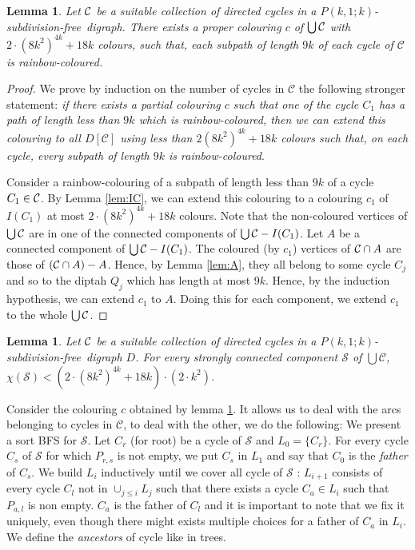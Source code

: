 \documentclass[utf8,10pt]{article}
\theoremstyle{plain}
\newtheorem{lemma}[theorem]{Lemma}
\theoremstyle{definition}
\theoremstyle{remark}
\newcommand{\dr}{ k^2}
\newcommand{\col}{(8k^2)^{4k}}
\newcommand{\free}{subdivision-free}
\begin{document}
\begin{lemma}\label{lem:col-union-cycle}
Let ${\cal C}$ be a suitable collection of directed cycles in a $P(k,1;k)$-\free\ digraph.
There exists a proper colouring $c$ of $\bigcup{\cal C}$ with $2\cdot \col + 18k$ colours, such that, each subpath of length $9k$ of each cycle of $\mathcal{C}$ is rainbow-coloured.
\end{lemma}
\begin{proof}
We prove by induction on the number of cycles in $\mathcal{C}$ the following stronger statement:
{\it if there exists
a partial colouring $c$ such that one of the cycle $C_1$ has a path of length less than $9k$
which is rainbow-coloured, then we can extend this colouring to all $D[\mathcal{C}]$ using less
than $2\col +18k$ colours such that, on each cycle, every subpath of length
$9k$ is rainbow-coloured}.

Consider a rainbow-colouring of a subpath of length less than $9k$ of a cycle $C_1\in {\cal C}$.
By Lemma \ref{lem:IC}, we can extend this colouring to a colouring $c_1$ of $I(C_1)$ at most $2\cdot \col + 18k$ colours.
Note that the non-coloured vertices of $\bigcup{\cal C}$ are in one of the connected components of $\bigcup{\cal C} - I(C_1)$.
Let $A$ be a connected component of $\bigcup{\cal C} - I(C_1)$. The coloured (by $c_1$) vertices of ${\cal C}\cap A$ are those of $({\cal C}\cap A)-A$. Hence, by Lemma \ref{lem:A}, they all belong to some cycle $C_j$ and so to the diptah $Q_j$ which has length at most $9k$.
Hence, by the induction hypothesis, we can extend $c_1$ to $A$. Doing this for each component, we extend $c_1$ to the whole $\bigcup{\cal C}$.
\end{proof}





\begin{lemma}\label{lem:DC}
Let ${\cal C}$ be a suitable collection of directed cycles in a $P(k,1;k)$-\free\ digraph $D$.
For every strongly connected component $\mathcal{S}$ of $\bigcup \mathcal{C}$, 
$\chi(\mathcal{S}) < (2\cdot \col + 18k) \cdot (2 \cdot \dr)$.
\end{lemma}

Consider the colouring $c$ obtained by lemma \ref{lem:col-union-cycle}. It allows us 
to deal with the arcs belonging to cycles in $\mathcal{C}$, to deal with the other, we do the following:
We present a sort BFS for $\mathcal{S}$.
Let $C_r$ (for root) be a cycle of $\mathcal{S}$ and $L_0 = \{C_r\}$. For every cycle $C_s$ of $\mathcal{S}$ for which 
$P_{r,s}$ is not empty, we put $C_s$ in $L_1$ and say that $C_0$ is the \textit{father} of $C_s$. We build $L_i$ inductively
until we cover all cycle of $\mathcal{S}$ : $L_{i+1}$ consists of every cycle $C_l$ not in $\cup_{j \leq i} L_j$ such that 
there exists a cycle $C_a \in L_i$ such that $P_{a,l}$ is non empty. $C_a$ is the father of $C_l$ and it is important to note that we 
fix it uniquely, even though there might exists multiple choices for a father of $C_a$ in $L_i$. We define the \textit{ancestors} of 
cycle like in trees.
\end{document}
